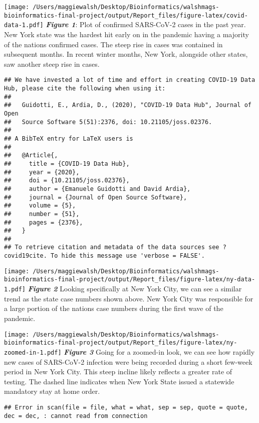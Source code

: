 \documentclass[
]{article}
\begin{document}
\texttt{[image: /Users/maggiewalsh/Desktop/Bioinformatics/walshmags-bioinformatics-final-project/output/Report\_files/figure-latex/covid-data-1.pdf]}
\textbf{\emph{Figure 1}}: Plot of confirmed SARS-CoV-2 cases in the past
year. New York state was the hardest hit early on in the pandemic having
a majority of the nations confirmed cases. The steep rise in cases was
contained in subsequent months. In recent winter months, New York,
alongside other states, saw another steep rise in cases.

\begin{verbatim}
## We have invested a lot of time and effort in creating COVID-19 Data Hub, please cite the following when using it:
## 
##   Guidotti, E., Ardia, D., (2020), "COVID-19 Data Hub", Journal of Open
##   Source Software 5(51):2376, doi: 10.21105/joss.02376.
## 
## A BibTeX entry for LaTeX users is
## 
##   @Article{,
##     title = {COVID-19 Data Hub},
##     year = {2020},
##     doi = {10.21105/joss.02376},
##     author = {Emanuele Guidotti and David Ardia},
##     journal = {Journal of Open Source Software},
##     volume = {5},
##     number = {51},
##     pages = {2376},
##   }
## 
## To retrieve citation and metadata of the data sources see ?covid19cite. To hide this message use 'verbose = FALSE'.
\end{verbatim}

\texttt{[image: /Users/maggiewalsh/Desktop/Bioinformatics/walshmags-bioinformatics-final-project/output/Report\_files/figure-latex/ny-data-1.pdf]}
\textbf{\emph{Figure 2}} Looking specifically at New York City, we can
see a similar trend as the state case numbers shown above. New York City
was responsible for a large portion of the nations case numbers during
the first wave of the pandemic.

\texttt{[image: /Users/maggiewalsh/Desktop/Bioinformatics/walshmags-bioinformatics-final-project/output/Report\_files/figure-latex/ny-zoomed-in-1.pdf]}
\textbf{\emph{Figure 3}} Going for a zoomed-in look, we can see how
rapidly new cases of SARS-CoV-2 infection were being recorded during a
short few-week period in New York City. This steep incline likely
reflects a greater rate of testing. The dashed line indicates when New
York State issued a statewide mandatory stay at home order.

\begin{verbatim}
## Error in scan(file = file, what = what, sep = sep, quote = quote, dec = dec, : cannot read from connection
\end{verbatim}
\end{document}
